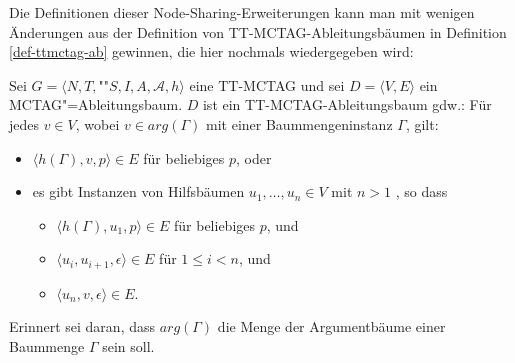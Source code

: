 Die Definitionen dieser Node-Sharing-Erweiterungen kann man mit wenigen Änderungen aus der Definition von TT-MCTAG-Ableitungsbäumen in Definition \ref{def-ttmctag-ab} gewinnen, die hier nochmals wiedergegeben wird:  
\begin{definition}
Sei $G = \langle N,T,$""$S,I,A,\mathcal{A},h \rangle$ eine TT-MCTAG und sei $D = \langle V,E \rangle$ ein MCTAG"=Ableitungsbaum. $D$ ist ein TT-MCTAG-Ablei\-tungs\-baum gdw.:
Für jedes $v \in V$, wobei $v \in arg(\Gamma)$ mit einer Baummengeninstanz $\Gamma$, gilt:
\begin{itemize} 
  \item $\langle h(\Gamma),v,p \rangle \in E$ für beliebiges $p$, oder
  \item es gibt Instanzen von Hilfsbäumen $u_1, \ldots, u_n \in V$ mit $n>1$ , so dass
  \begin{itemize}
    \item $\langle h(\Gamma),u_1,p \rangle \in E$ für beliebiges $p$, und
    \item $\langle u_i,u_{i+1},\epsilon \rangle \in E$ für $1 \leq i < n$, und
    \item $\langle u_n,v,\epsilon \rangle \in E$.
  \end{itemize}
\end{itemize}  
\end{definition}
Erinnert sei daran, dass $arg(\Gamma)$ die Menge der Argumentbäume einer Baummenge $\Gamma$ sein soll.


